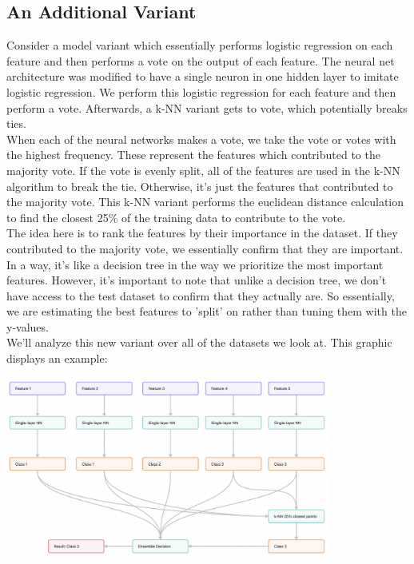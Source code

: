 \documentclass{article}
\begin{document}
\vfill

\restoregeometry


\subsection*{An Additional Variant}
Consider a model variant which essentially performs logistic regression on each feature and then performs a vote on the output of each feature.
The neural net architecture was modified to have a single neuron in one hidden layer to imitate logistic regression. We perform this logistic regression for each feature
and then perform a vote. Afterwards, a k-NN variant gets to vote, which potentially breaks ties.
\\

When each of the neural networks makes a vote, we take the vote or votes with the highest frequency. These represent the features which contributed to the majority vote.
If the vote is evenly split, all of the features are used in the k-NN algorithm to break the tie. Otherwise, it's just the features that contributed to the majority vote.
This k-NN variant performs the euclidean distance calculation to find the closest 25\% of the training data to contribute to the vote.
\\

The idea here is to rank the features by their importance in the dataset. If they contributed to the majority vote, we essentially confirm
that they are important. In a way, it's like a decision tree in the way we prioritize the most important features. However, it's important
to note that unlike a decision tree, we don't have access to the test dataset to confirm that they actually are. So essentially, we are estimating the 
best features to 'split' on rather than tuning them with the y-values.
\\

We'll analyze this new variant over all of the datasets we look at. This graphic displays an example:
\begin{center}
    \includegraphics*[width=0.8\textwidth]{./src/figures/variant.png}
\end{center}
\end{document}
